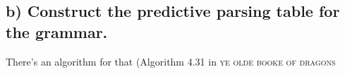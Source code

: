 \subsection{b) Construct the predictive parsing table for the grammar.}
There's an algorithm for that (Algorithm 4.31 in \textsc{ye olde booke of dragons}

\begin{table}[H]
\begin{center}
\begin{tabular}
\end{tabular}
\end{center}
\end{table}
